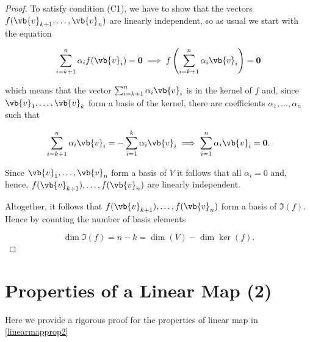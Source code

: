 \documentclass[a4paper,12pt]{report}
\begin{document}
\begin{appendices}
\begin{proof}
To satisfy condition (C1), we have to show that the vectors \(f(\vb{v} _{k+1}, \ldots , \vb{v} _{n}  )\) are linearly independent, so as usual we start with the equation
    
\begin{equation}
        \sum_{i=k+1}^{n} \alpha _{i}f(\vb{v} _{i} ) = \boldsymbol{0}  \implies f \left( \sum_{i=k+1}^{n} \alpha _{i}\vb{v} _{i}   \right) = \boldsymbol{0}   
\end{equation}
    
which means that the vector \(\sum_{i=k+1}^{n} \alpha _{i} \vb{v} _{i} \) is in the kernel of \(f\) and, since \(\vb{v}_{1}, \ldots, \vb{v}_k \) form a basis of the kernel, there are coefficients \(\alpha _{1} ,\ldots ,\alpha _{n} \) such that
    
\begin{equation}
        \sum_{i=k+1}^{n} \alpha _{i} \vb{v} _{i} = -\sum_{i=1}^{k} \alpha _{i} \vb{v} _{i} \implies \sum_{i=1}^{n} \alpha _{i} \vb{v} _{i} = \boldsymbol{0} .
\end{equation}
    
Since \(\vb{v}_{1}, \ldots, \vb{v}_n \) form a basis of \(V\) it follows that all \(\alpha _{i} = 0\) and, hence, \(f(\vb{v} _{k+1} ),\ldots , f(\vb{v} _{n} )\) are linearly independent. 
    
Altogether, it follows that \(f(\vb{v} _{k+1} ), \ldots , f(\vb{v} _{n} )\) form a basis of \(\Im (f)\). Hence by counting the number of basis elements
    
\begin{equation}
    \dim \Im (f) = n-k = \dim (V) - \dim \ker (f).
\end{equation}
    
\end{proof}

\section{Properties of a Linear Map (2)} \label{linearmapprop2app}

Here we provide a rigorous proof for the properties of linear map in \cref{linearmapprop2}


\end{appendices}
\end{document}
